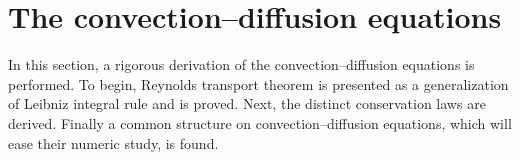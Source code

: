 
\section{The convection--diffusion equations}

In this section, a rigorous derivation of the convection--diffusion equations is performed. To begin, Reynolds transport theorem is presented as a generalization of Leibniz integral rule and is proved. Next, the distinct conservation laws are derived. Finally a common structure on convection--diffusion equations, which will ease their numeric study, is found.








